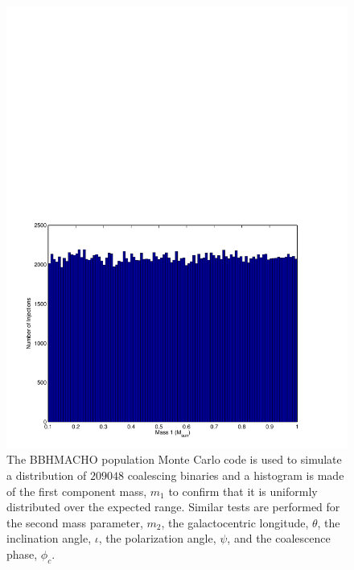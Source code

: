 \begin{figure}[p]
\label{f:m1_hist}
\begin{center}
\includegraphics[width=\linewidth]{figures/macho/m1_hist}
\end{center}
\caption[Histogram of BBHMACHO Monte Carlo Mass Distribution]{
The BBHMACHO population Monte Carlo code is used to simulate a distribution of
$209048$ coalescing binaries and a histogram is made of the first component
mass, $m_1$ to confirm that it is uniformly distributed over the expected
range.  Similar tests are performed for the second mass parameter, $m_2$, the
galactocentric longitude, $\theta$, the inclination angle, $\iota$, the
polarization angle, $\psi$, and the coalescence phase, $\phi_c$.
}
\end{figure}

